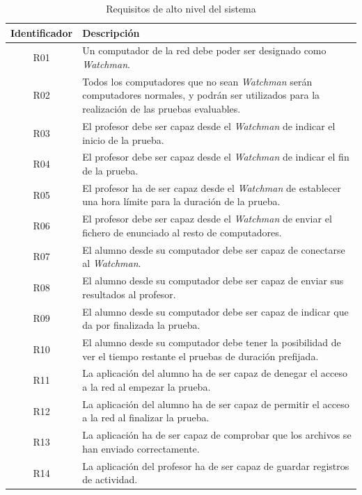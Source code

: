 \begin{table}
\begin{tabular}{|c|p{12cm}|}
	\hline
	\textbf{Identificador} & \textbf{Descripción}
	\\ \hline

	R01 & Un computador de la red debe poder ser designado como \emph{Watchman}.
	\\ \hline

	R02 & Todos los computadores que no sean \emph{Watchman} serán computadores
	normales, y podrán ser utilizados para la realización de las pruebas evaluables.
	\\ \hline

	R03 & El profesor debe ser capaz desde el \emph{Watchman} de indicar el inicio de la prueba.
	\\ \hline

	R04 & El profesor debe ser capaz desde el \emph{Watchman} de indicar el fin de la prueba.
	\\ \hline

	R05 & El profesor ha de ser capaz desde el \emph{Watchman} de establecer una hora límite para la duración de la prueba.
	\\ \hline

	R06 & El profesor debe ser capaz desde el \emph{Watchman} de enviar el fichero de enunciado al resto de computadores.
	\\ \hline

	R07 & El alumno desde su computador debe ser capaz de conectarse al \emph{Watchman}.
	\\ \hline

	R08 & El alumno desde su computador debe ser capaz de enviar sus resultados al profesor.
	\\ \hline

	R09 & El alumno desde su computador debe ser capaz de indicar que da por finalizada la prueba.
	\\ \hline

	R10 & El alumno desde su computador debe tener la posibilidad de ver el tiempo restante el pruebas de duración prefijada.
	\\ \hline

	R11 & La aplicación del alumno ha de ser capaz de denegar el acceso a la red al empezar la prueba.
	\\ \hline

	R12 & La aplicación del alumno ha de ser capaz de permitir el acceso a la red al finalizar la prueba.
	\\ \hline

	R13 & La aplicación ha de ser capaz de comprobar que los archivos se han enviado correctamente.
	\\ \hline

	R14 & La aplicación del profesor ha de ser capaz de guardar registros de actividad.
	\\ \hline

\end{tabular}
\caption{Requisitos de alto nivel del sistema}
\label{tabla:requisitos}
\end{table}

